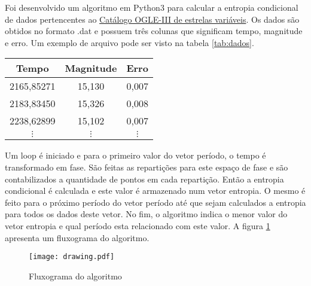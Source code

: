 Foi desenvolvido um algoritmo em Python3 para calcular a entropia condicional de dados pertencentes ao \href{http://ogledb.astrouw.edu.pl/~ogle/CVS/}{Catálogo OGLE-III de estrelas variáveis}. Os dados são obtidos no formato .dat e possuem três colunas que significam tempo, magnitude e erro. Um exemplo de arquivo pode ser visto na tabela \ref{tab:dados}.
\begin{center}
\begin{tabular}{c|c|c} 
\hline 
Tempo & Magnitude & Erro \\ 
\hline 
2165,85271 & 15,130 & 0,007 \\ 
2183,83450 & 15,326 & 0,008 \\ 
2238,62899 & 15,102 & 0,007 \\ 
$\vdots$ & $\vdots$ & $\vdots$ \\
\hline 
\end{tabular} 
\label{tab:dados}
\end{center}

Um loop é iniciado e para o primeiro valor do vetor período, o tempo é transformado em fase. São feitas as reparti\c{c}ões para este espa\c{c}o de fase e são contabilizados a quantidade de pontos em cada reparti\c{c}ão. Então a entropia condicional é calculada e este valor é armazenado num vetor entropia. O mesmo é feito para o próximo período do vetor período até que sejam calculados a entropia para todos os dados deste vetor. No fim, o algoritmo indica o menor valor do vetor entropia e qual período esta relacionado com este valor. A figura \ref{fig:flow} apresenta um fluxograma do algoritmo.

\begin{figure}[!hb]
\centering
	\texttt{[image: drawing.pdf]}
	\caption{Fluxograma do algoritmo}
	\label{fig:flow}
\end{figure}

